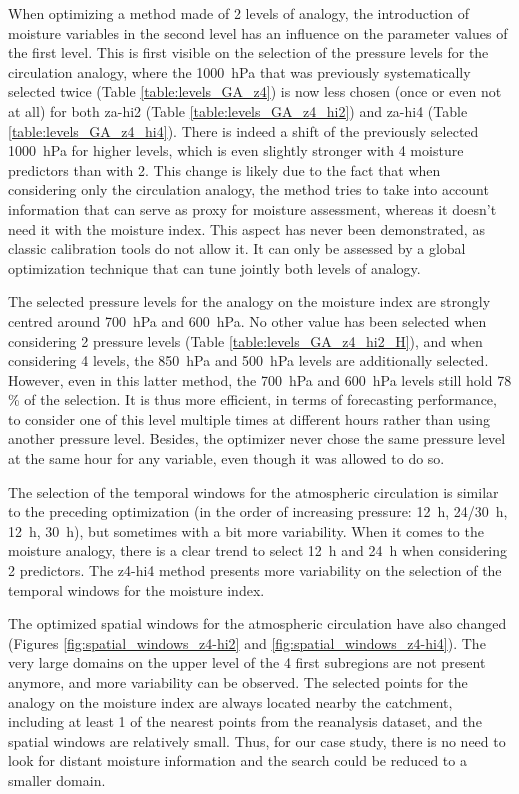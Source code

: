 \documentclass{ametsoc}
\begin{document}
When optimizing a method made of 2 levels of analogy, the introduction of moisture variables in the second level has an influence on the parameter values of the first level. This is first visible on the selection of the pressure levels for the circulation analogy, where the 1000~hPa that was previously systematically selected twice (Table \ref{table:levels_GA_z4}) is now less chosen (once or even not at all) for both za-hi2 (Table \ref{table:levels_GA_z4_hi2}) and za-hi4 (Table \ref{table:levels_GA_z4_hi4}). There is indeed a shift of the previously selected 1000~hPa for higher levels, which is even slightly stronger with 4 moisture predictors than with 2. This change is likely due to the fact that when considering only the circulation analogy, the method tries to take into account information that can serve as proxy for moisture assessment, whereas it doesn't need it with the moisture index. This aspect has never been demonstrated, as classic calibration tools do not allow it. It can only be assessed by a global optimization technique that can tune jointly both levels of analogy. 

The selected pressure levels for the analogy on the moisture index are strongly centred around 700~hPa and 600~hPa. No other value has been selected when considering 2 pressure levels (Table \ref{table:levels_GA_z4_hi2_H}), and when considering 4 levels, the 850~hPa and 500~hPa levels are additionally selected. However, even in this latter method, the 700~hPa and 600~hPa levels still hold 78 \% of the selection. It is thus more efficient, in terms of forecasting performance, to consider one of this level multiple times at different hours rather than using another pressure level. Besides, the optimizer never chose the same pressure level at the same hour for any variable, even though it was allowed to do so.

The selection of the temporal windows for the atmospheric circulation is similar to the preceding optimization (in the order of increasing pressure: 12~h, 24/30~h, 12~h, 30~h), but sometimes with a bit more variability. When it comes to the moisture analogy, there is a clear trend to select 12~h and 24~h when considering 2 predictors. The z4-hi4 method presents more variability on the selection of the temporal windows for the moisture index.

The optimized spatial windows for the atmospheric circulation have also changed (Figures \ref{fig:spatial_windows_z4-hi2} and \ref{fig:spatial_windows_z4-hi4}). The very large domains on the upper level of the 4 first subregions are not present anymore, and more variability can be observed. The selected points for the analogy on the moisture index are always located nearby the catchment, including at least 1 of the nearest points from the reanalysis dataset, and the spatial windows are relatively small. Thus, for our case study, there is no need to look for distant moisture information and the search could be reduced to a smaller domain. 
\end{document}
